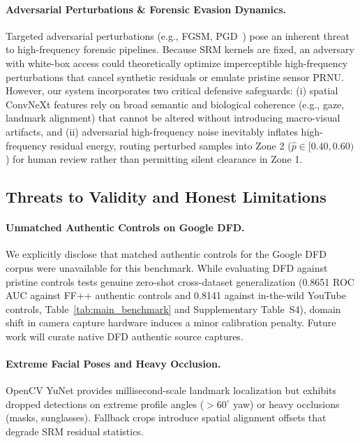 \documentclass[10pt,twocolumn,letterpaper]{article}
\begin{document}
\paragraph{Adversarial Perturbations \& Forensic Evasion Dynamics.}
Targeted adversarial perturbations (e.g., FGSM, PGD~\cite{goodfellow2014explaining}) pose an inherent threat to high-frequency forensic pipelines. Because SRM kernels are fixed, an adversary with white-box access could theoretically optimize imperceptible high-frequency perturbations that cancel synthetic residuals or emulate pristine sensor PRNU. However, our system incorporates two critical defensive safeguards: (i) spatial ConvNeXt features rely on broad semantic and biological coherence (e.g., gaze, landmark alignment) that cannot be altered without introducing macro-visual artifacts, and (ii) adversarial high-frequency noise inevitably inflates high-frequency residual energy, routing perturbed samples into Zone 2 ($\hat{p} \in [0.40, 0.60)$) for human review rather than permitting silent clearance in Zone 1.

\subsection{Threats to Validity and Honest Limitations}
\label{sec:disc_limitations}

\paragraph{Unmatched Authentic Controls on Google DFD.}
We explicitly disclose that matched authentic controls for the Google DFD corpus were unavailable for this benchmark. While evaluating DFD against pristine controls tests genuine zero-shot cross-dataset generalization (0.8651 ROC AUC against FF++ authentic controls and 0.8141 against in-the-wild YouTube controls, Table~\ref{tab:main_benchmark} and Supplementary Table~S4), domain shift in camera capture hardware induces a minor calibration penalty. Future work will curate native DFD authentic source captures.

\paragraph{Extreme Facial Poses and Heavy Occlusion.}
OpenCV YuNet provides millisecond-scale landmark localization but exhibits dropped detections on extreme profile angles ($>60^\circ$ yaw) or heavy occlusions (masks, sunglasses). Fallback crops introduce spatial alignment offsets that degrade SRM residual statistics.
\end{document}
